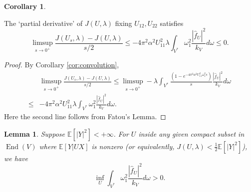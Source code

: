 \documentclass[a4paper]{article}
\newcommand{\red}[1]{\textcolor{red}{#1}}
\newtheorem{lem}[thm]{Lemma}
\theoremstyle{definition}
\newtheorem{cor}[thm]{Corollary}
\newcommand{\E}{\mathbb{E}}
\newcommand{\1}{\mathbbm{1}}
\DeclareMathOperator{\End}{End}
\begin{document}
	
	
	
	
	
	
	
	\begin{cor}\label{cor:Gaussianonevariable} 
		
		The `partial derivative' of $J(U,\lambda)$ fixing $U_{12}, U_{22}$ satisfies
		\[
		\limsup_{s\to 0^+} \frac{J(U_s, \lambda)-J(U,\lambda)}{s/2}  \leq -4\pi^2\alpha^2 U_{11}^2 \lambda\int_{V^*} \omega_1^2  \frac{ |\hat{f}_U|^2}{k_V} d\omega \leq 0.
		\]
		
	\end{cor}
	
	
	
	
	
	\begin{proof}
		By Corollary \ref{cor:convolution},
		\[
		\begin{split}
			&	\limsup_{s\to 0^+} \frac{J(U_s, \lambda)-J(U,\lambda)}{s/2}  \leq \limsup_{s\to 0^+} - \lambda \int_{V^*} \frac{(1-e^{-4\pi^2\alpha^2  U_{11}^2 \omega_1^2 s})}{s} \frac{ |\hat{f}_U|^2}{k_V} d\omega
			\\
			\leq &  -4\pi^2\alpha^2 U_{11}^2\lambda\int_{V^*} \omega_1^2  \frac{ |\hat{f}_U|^2}{k_V} d\omega .
		\end{split}
		\]
		Here the second line follows from Fatou's Lemma. 
	\end{proof}
	
	
	
	
	\begin{lem}\label{lem:expdecayrate}
		Suppose $\E[|Y|^2] <+\infty$.
		For $U$ inside any given compact subset in $\End(V)$ where $\E[Y|UX]$ is nonzero (or equivalently, $J(U,\lambda)<\frac{1}{2}\E[|Y|^2]$), we have
		\[
		\inf_U\int_{V^*} \omega_1^2  \frac{ |\hat{f}_U|^2}{k_V} d\omega >0.
		\]
		
		
		
	\end{lem}
	
\end{document}
